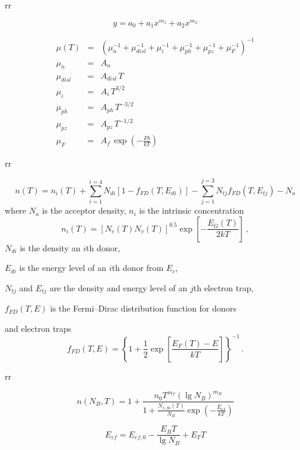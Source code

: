 \documentclass[14pt]{article}
\numberwithin{equation}{part}
\begin{document}
rr

\begin{equation*}
  y=a_0+a_1x^{m_1}+a_2x^{m_2}
\end{equation*}

\begin{eqnarray*}
    \mu(T)&=&(\mu_n^{-1}+\mu_{disl}^{-1}+\mu_i^{-1}+\mu_{ph}^{-1}+\mu_{pz}^{-1}+\mu_{F}^{-1})^{-1}\\
    \mu_n&=&A_n\\
    \mu_{disl}&=&A_{disl}\,T\\
    \mu_{i}&=&A_{i}\,T^{3/2}\\
    \mu_{ph}&=&A_{ph}\,T^{-3/2}\\
    \mu_{pz}&=&A_{pz}\,T^{-1/2}\\
    \mu_{F}&=&A_{f}\,\exp\left(-\frac{Fb}{kT}\right)
\end{eqnarray*}


rr

\begin{equation*}
    n(T)=n_i(T)+\sum_{i=1}^{i=4}N_{di}[1-f_{FD}(T,E_{di})]-\sum_{j=1}^{j=3}N_{tj}f_{FD}(T,E_{tj})-N_a
\end{equation*}
where
$N_a$ is the acceptor density,
$n_i$ is the intrinsic concentration
\begin{equation*}
    n_i(T)=[N_c(T)N_v(T)]^{0.5}\exp\left[-\frac{E_G(T)}{2kT}\right]\,,
\end{equation*}
$N_{di}$ is the density an $i$th donor,

\noindent
$E_{di}$ is the energy level of an $i$th donor from $E_c$,

\noindent
$N_{tj}$ and $E_{tj}$ are the density and energy level of an $j$th electron trap,

\noindent
$f_{FD}(T,E)$ is the Fermi--Dirac distribution function for donors

\noindent
and electron traps
\begin{equation*}
    f_{FD}(T,E)=\left\{1+\frac{1}{2}\exp\left[\frac{E_F(T)-E}{kT}\right]\right\}^{-1}\,.
\end{equation*}

rr

\begin{equation*}
    n(N_B, T)=1+\frac{n_0T^{m_T}(\lg N_B)^{m_B}}{1+\frac{N_{v,Si}(T)}{N_B}\exp\left(-\frac{E_{ef}}{kT}\right)}
\end{equation*}

\begin{equation*}
    E_{ef}=E_{ef,0}-\frac{E_B T}{\lg N_B}+E_T T
\end{equation*}
\end{document}
